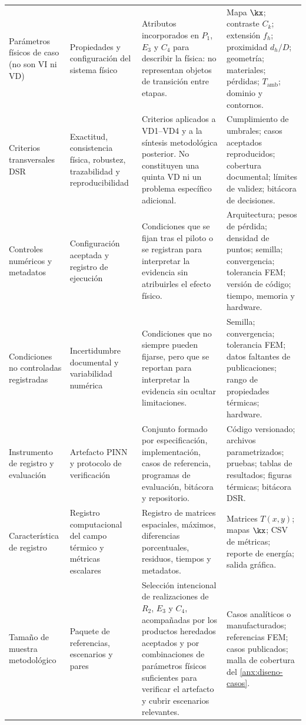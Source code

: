 \begin{longtable}{L{4.00cm}L{4.20cm}L{8.20cm}L{6.30cm}}
Parámetros físicos de caso (no son VI ni VD) & Propiedades y configuración del sistema físico & Atributos incorporados en $P_1$, $E_3$ y $C_4$ para describir la física: no representan objetos de transición entre etapas. & Mapa $\kx$; contraste $C_k$; extensión $f_h$; proximidad $d_h/D$; geometría; materiales; pérdidas; $T_{\mathrm{amb}}$; dominio y contornos. \\

Criterios transversales DSR & Exactitud, consistencia física, robustez, trazabilidad y reproducibilidad & Criterios aplicados a VD1--VD4 y a la síntesis metodológica posterior. No constituyen una quinta VD ni un problema específico adicional. & Cumplimiento de umbrales; casos aceptados reproducidos; cobertura documental; límites de validez; bitácora de decisiones. \\

Controles numéricos y metadatos & Configuración aceptada y registro de ejecución & Condiciones que se fijan tras el piloto o se registran para interpretar la evidencia sin atribuirles el efecto físico. & Arquitectura; pesos de pérdida; densidad de puntos; semilla; convergencia; tolerancia FEM; versión de código; tiempo, memoria y hardware. \\

Condiciones no controladas registradas & Incertidumbre documental y variabilidad numérica & Condiciones que no siempre pueden fijarse, pero que se reportan para interpretar la evidencia sin ocultar limitaciones. & Semilla; convergencia; tolerancia FEM; datos faltantes de publicaciones; rango de propiedades térmicas; hardware. \\

Instrumento de registro y evaluación & Artefacto PINN y protocolo de verificación & Conjunto formado por especificación, implementación, casos de referencia, programas de evaluación, bitácora y repositorio. & Código versionado; archivos parametrizados; pruebas; tablas de resultados; figuras térmicas; bitácora DSR. \\

Característica de registro & Registro computacional del campo térmico y métricas escalares & Registro de matrices espaciales, máximos, diferencias porcentuales, residuos, tiempos y metadatos. & Matrices $T(x,y)$; mapas $\kx$; CSV de métricas; reporte de energía; salida gráfica. \\

Tamaño de muestra metodológico & Paquete de referencias, escenarios y pares & Selección intencional de realizaciones de $R_2$, $E_3$ y $C_4$, acompañadas por los productos heredados aceptados y por combinaciones de parámetros físicos suficientes para verificar el artefacto y cubrir escenarios relevantes. & Casos analíticos o manufacturados; referencias FEM; casos publicados; malla de cobertura del \ref{anx:diseno-casos}. \\

\end{longtable}
